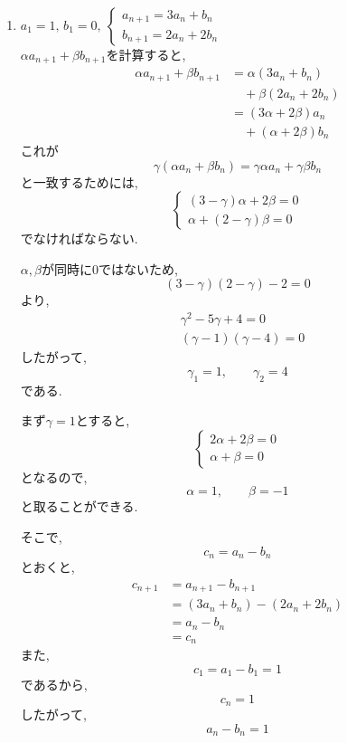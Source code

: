 \begin{enumerate}[label=(\arabic*),parsep=3pt]
\begin{enumerate}
                  また,\((1)-(2)\)をすると,
                  \[
                    2b_n=2\cdot4^{n-1}
                  \]
                  なので,
                  \[
                    b_n=4^{n-1}
                  \]
          \end{enumerate}
    \item $\displaystyle a_1=1,\,b_1=0,\ \begin{cases}a_{n+1}=3a_n+b_n\\ b_{n+1}=2a_n+2b_n\end{cases}$\\
          $\alpha a_{n+1}+\beta b_{n+1}$を計算すると,
          \begin{align*}
            \alpha a_{n+1}+\beta b_{n+1}
              &=\alpha(3a_n+b_n)\\
              &\quad +\beta(2a_n+2b_n)\\
              &=(3\alpha+2\beta)a_n\\
              &\quad +(\alpha+2\beta)b_n
          \end{align*}
          これが
          \[
            \gamma(\alpha a_n+\beta b_n)
            =\gamma\alpha a_n+\gamma\beta b_n
          \]
          と一致するためには,
          \[
          \begin{cases}
            (3-\gamma)\alpha+2\beta=0\\
            \alpha+(2-\gamma)\beta=0
          \end{cases}
          \]
          でなければならない.

          $\alpha,\beta$が同時に$0$ではないため,
          \[
            (3-\gamma)(2-\gamma)-2=0
          \]
          より,
          \begin{align*}
            &\gamma^2-5\gamma+4=0\\
            &(\gamma-1)(\gamma-4)=0
          \end{align*}
          したがって,
          \[
            \gamma_1=1,\qquad\gamma_2=4
          \]
          である.

          まず$\gamma=1$とすると,
          \[
          \begin{cases}
            2\alpha+2\beta=0\\
            \alpha+\beta=0
          \end{cases}
          \]
          となるので,
          \[
            \alpha=1,\qquad\beta=-1
          \]
          と取ることができる.

          そこで,
          \[
            c_n=a_n-b_n
          \]
          とおくと,
          \begin{align*}
            c_{n+1}
              &=a_{n+1}-b_{n+1}\\
              &=(3a_n+b_n)-(2a_n+2b_n)\\
              &=a_n-b_n\\
              &=c_n
          \end{align*}
          また,
          \[
            c_1=a_1-b_1=1
          \]
          であるから,
          \[
            c_n=1
          \]
          したがって,
          \[
            a_n-b_n=1
          \]


\end{enumerate}
